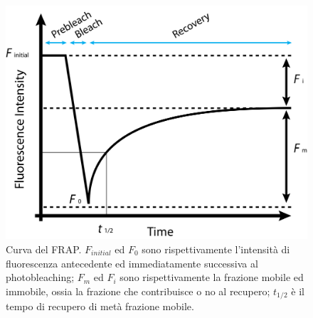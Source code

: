 \begin{figure}
 \centering
 \includegraphics[scale=.80]{img/CAP1FRAP.png}
 \caption{\small{Curva del FRAP. $F_{initial}$ ed $F_0$ sono rispettivamente l'intensità di fluorescenza antecedente ed immediatamente successiva al photobleaching; $F_m$ ed $F_i$ sono rispettivamente la frazione mobile ed immobile, ossia la frazione che contribuisce o no al recupero; $t_{1/2}$ è il tempo di recupero di metà frazione mobile.}}
 \label{fig:FRAP}
\end{figure}

